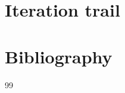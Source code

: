 \documentclass[11pt]{article}
\theoremstyle{definition}
\theoremstyle{plain}
\theoremstyle{remark}
\begin{document}
\section{Iteration trail}

\section*{Bibliography}
\begin{thebibliography}{99}
\end{thebibliography}
\end{document}
